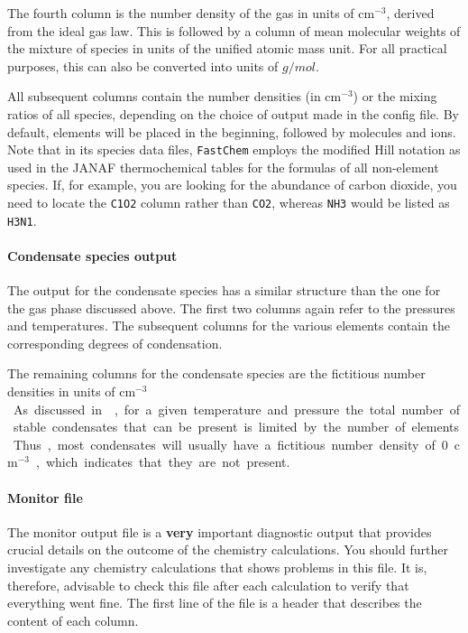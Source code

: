 \documentclass[numbers=noenddot]{aux/fcmanual}
\newcommand{\fc}{\texttt{FastChem}\xspace}
\begin{document}
The fourth column is the number density of the gas in units of cm$^{-3}$, derived from the ideal gas law. This is followed by a column of mean molecular weights of the mixture of species in units of the unified atomic mass unit. For all practical purposes, this can also be converted into units of $\unit{g/mol}$.

All subsequent columns contain the number densities (in cm$^{-3}$) or the mixing ratios of all species, depending on the choice of output made in the config file. By default, elements will be placed in the beginning, followed by molecules and ions. Note that in its species data files, \fc employs the modified Hill notation as used in the JANAF thermochemical tables \citep{Chase1986jtt..book.....C} for the formulas of all non-element species. If, for example, you are looking for the abundance of carbon dioxide, you need to locate the \verb|C1O2| column rather than \verb|CO2|, whereas \verb|NH3| would be listed as \verb|H3N1|.


\paragraph{Condensate species output} 
The output for the condensate species has a similar structure than the one for the gas phase discussed above. The first two columns again refer to the pressures and temperatures. The subsequent columns for the various elements contain the corresponding degrees of condensation. 

The remaining columns for the condensate species are the fictitious number densities in units of \unit{cm$^{-3}$}. As discussed in \citet{Kitzmann2023inprep}, for a given temperature and pressure the total number of stable condensates that can be present is limited by the number of elements. Thus, most condensates will usually have a fictitious number density of 0 \unit{cm$^{-3}$}, which indicates that they are not present.


\paragraph{Monitor file} The monitor output file is a \textbf{very} important diagnostic output that provides crucial details on the outcome of the chemistry calculations. You should further investigate any chemistry calculations that shows problems in this file. It is, therefore, advisable to check this file after each calculation to verify that everything went fine. The first line of the file is a header that describes the content of each column.
\end{document}

